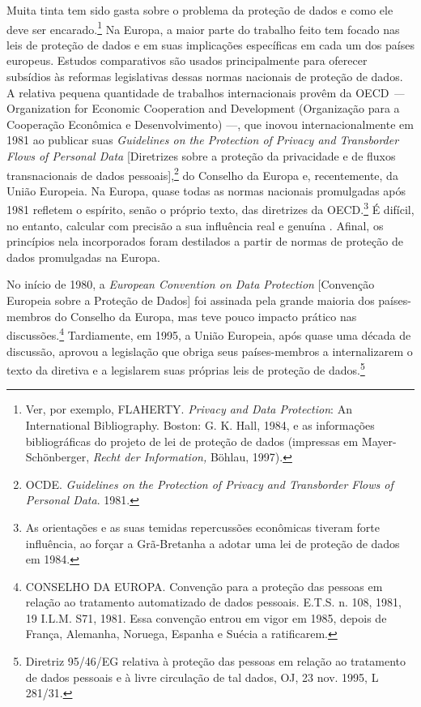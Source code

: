 Muita tinta tem sido gasta sobre o problema da proteção de dados e como
ele deve ser encarado.\footnote{Ver, por exemplo, FLAHERTY.
  \emph{Privacy and Data Protection}: An International Bibliography.
  Boston: G. K. Hall, 1984, e as informações bibliográficas do projeto
  de lei de proteção de dados (impressas em Mayer-Schönberger,
  \emph{Recht der Information,} Böhlau, 1997).} Na Europa, a maior parte
do trabalho feito tem focado nas leis de proteção de dados e em suas
implicações específicas em cada um dos países europeus. Estudos
comparativos são usados principalmente para oferecer subsídios às
reformas legislativas dessas normas nacionais de proteção de dados. A
relativa pequena quantidade de trabalhos internacionais provêm da OECD
\emph{---} Organization for Economic Cooperation and Development
(Organização para a Cooperação Econômica e Desenvolvimento) ---, que
inovou internacionalmente em 1981 ao publicar suas \emph{Guidelines on
the Protection of Privacy and Transborder Flows of Personal Data}
{[}Diretrizes sobre a proteção da privacidade e de fluxos transnacionais
de dados pessoais{]},\footnote{OCDE. \emph{Guidelines on the Protection
  of Privacy and Transborder Flows of Personal Data}. 1981.} do Conselho
da Europa e, recentemente, da União Europeia. Na Europa, quase todas as
normas nacionais promulgadas após 1981 refletem o espírito, senão o
próprio texto, das diretrizes da OECD.\footnote{As orientações e as suas
  temidas repercussões econômicas tiveram forte influência, ao forçar a
  Grã-Bretanha a adotar uma lei de proteção de dados em 1984.} É
difícil, no entanto, calcular com precisão a sua influência real e
genuína . Afinal, os princípios nela incorporados foram destilados a
partir de normas de proteção de dados promulgadas na Europa.

No início de 1980, a \emph{European Convention on Data Protection}
{[}Convenção Europeia sobre a Proteção de Dados{]} foi assinada pela
grande maioria dos países-membros do Conselho da Europa, mas teve pouco
impacto prático nas discussões.\footnote{CONSELHO DA EUROPA. Convenção
  para a proteção das pessoas em relação ao tratamento automatizado de
  dados pessoais. E.T.S. n. 108, 1981, 19 I.L.M. S71, 1981. Essa
  convenção entrou em vigor em 1985, depois de França, Alemanha,
  Noruega, Espanha e Suécia a ratificarem.} Tardiamente, em 1995, a
União Europeia, após quase uma década de discussão, aprovou a legislação
que obriga seus países-membros a internalizarem o texto da diretiva e a
legislarem suas próprias leis de proteção de dados.\footnote{Diretriz
  95/46/EG relativa à proteção das pessoas em relação ao tratamento de
  dados pessoais e à livre circulação de tal dados, OJ, 23 nov. 1995, L
  281/31.}

